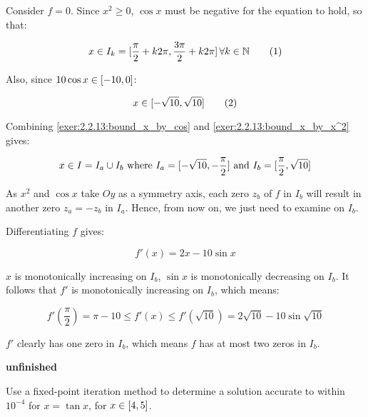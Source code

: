 \documentclass[../../../../Assignments]{subfiles}
\begin{document}
\begin{solution}
    Consider \(f = 0\). Since \(x^2 \geq 0\), \(\cos{x}\) must be negative for
    the equation to hold, so that:

    \begin{equation*}\label{exer:2.2.13:bound_x_by_cos}
        x \in I_k = \interval{\frac{\pi}{2} + k 2 \pi}{\frac{3 \pi}{2} + k 2 \pi} \, \forall k \in \mathbb{N} \tag{1}
    \end{equation*}

    Also, since \(10 \cos{x} \in \interval{-10}{0}\):

    \begin{equation*}\label{exer:2.2.13:bound_x_by_x^2}
        x \in \interval{- \sqrt{10}}{\sqrt{10}} \tag{2}
    \end{equation*}

    Combining \eqref{exer:2.2.13:bound_x_by_cos} and
    \eqref{exer:2.2.13:bound_x_by_x^2} gives:

    \[x \in I = I_a \cup I_b \text{ where } I_a = \interval{- \sqrt{10}}{- \frac{\pi}{2}} \text{ and } I_b = \interval{\frac{\pi}{2}}{\sqrt{10}}\]

    As \(x^2\) and \(\cos{x}\) take \(Oy\) as a symmetry axis, each zero \(z_b\)
    of \(f\) in \(I_b\) will result in another zero \(z_a = - z_b\) in \(I_a\).
    Hence, from now on, we just need to examine on \(I_b\).

    Differentiating \(f\) gives:

    \[f'(x) = 2x - 10 \sin{x}\]

    \(x\) is monotonically increasing on \(I_b\), \(\sin{x}\) is monotonically
    decreasing on \(I_b\). It follows that \(f'\) is monotonically increasing on
    \(I_b\), which means:

    \[f'(\frac{\pi}{2}) = \pi - 10 \leq f'(x) \leq f'(\sqrt{10}) = 2 \sqrt{10} - 10 \sin{\sqrt{10}}\]

    \(f'\) clearly has one zero in \(I_b\), which means \(f\) has at most two
    zeros in \(I_b\).

    \begin{center}
        \textbf{unfinished}
    \end{center}
\end{solution}

\begin{exercise}
    Use a fixed-point iteration method to determine a solution accurate to
    within \(10^{-4}\) for \(x = \tan{x}\), for \(x \in \interval{4}{5}\).
\end{exercise}

\begin{solution}
    
\end{solution}
\end{document}
